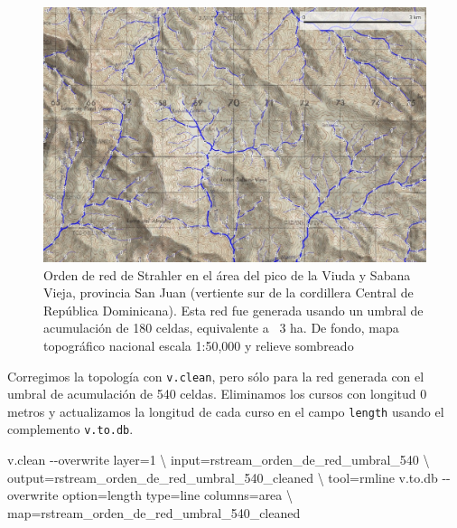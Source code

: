 \documentclass[spanish]{article}
\newenvironment{Shaded}{\begin{snugshade}}{\end{snugshade}}
\newcommand{\AttributeTok}[1]{\textcolor[rgb]{0.77,0.63,0.00}{#1}}
\newcommand{\DataTypeTok}[1]{\textcolor[rgb]{0.13,0.29,0.53}{#1}}
\newcommand{\ExtensionTok}[1]{#1}
\newcommand{\NormalTok}[1]{#1}
\begin{document}
\begin{figure}

{\centering \includegraphics[width=1\linewidth]{figuras/red-orden-detalle-mtn} 

}

\caption{Orden de red de Strahler en el área del pico de la Viuda y Sabana Vieja, provincia San Juan (vertiente sur de la cordillera Central de República Dominicana). Esta red fue generada usando un umbral de acumulación de 180 celdas, equivalente a ~3 ha. De fondo, mapa topográfico nacional escala 1:50,000 y relieve sombreado}\label{fig:redordenumbral180}
\end{figure}

Corregimos la topología con \texttt{v.clean}, pero sólo para la red
generada con el umbral de acumulación de 540 celdas. Eliminamos los
cursos con longitud 0 metros y actualizamos la longitud de cada curso en
el campo \texttt{length} usando el complemento \texttt{v.to.db}.

\begin{Shaded}
\begin{Highlighting}[]
\ExtensionTok{v.clean} \AttributeTok{{-}{-}overwrite}\NormalTok{ layer=1 }\DataTypeTok{\textbackslash{}}
\NormalTok{  input=rstream\_orden\_de\_red\_umbral\_540 }\DataTypeTok{\textbackslash{}}
\NormalTok{  output=rstream\_orden\_de\_red\_umbral\_540\_cleaned }\DataTypeTok{\textbackslash{}}
\NormalTok{  tool=rmline}
\ExtensionTok{v.to.db} \AttributeTok{{-}{-}overwrite}\NormalTok{ option=length type=line columns=area }\DataTypeTok{\textbackslash{}}
\NormalTok{  map=rstream\_orden\_de\_red\_umbral\_540\_cleaned}
\end{Highlighting}
\end{Shaded}
\end{document}
